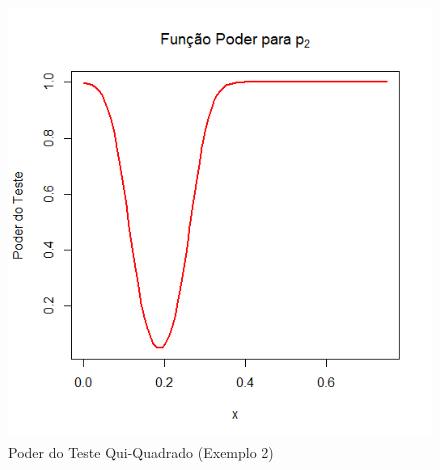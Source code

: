 \documentclass[12pt]{beamer}
\begin{document}
\begin{frame}{}
\begin{block}{}
\begin{figure}
    \centering
    \includegraphics[scale=0.5]{Aula13ChiSquareTests/figs/Ex2p2.png}
    \caption{Poder do Teste Qui-Quadrado (Exemplo 2)}
    \label{fig:enter-label}
\end{figure}
\end{block}
\end{frame}
\end{document}

